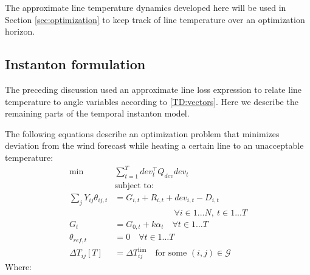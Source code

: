 \documentclass[conference]{IEEEtran}
\begin{document}
The approximate line temperature dynamics developed here will be used in Section \ref{sec:optimization} to keep track of line temperature over an optimization horizon.

\subsection{Instanton formulation}\label{sec:instanton-formulation}
The preceding discussion used an approximate line loss expression to relate line temperature to angle variables according to \eqref{TD:vectors}. Here we describe the remaining parts of the temporal instanton model.

The following equations describe an optimization problem that minimizes deviation from the wind forecast while heating a certain line to an unacceptable temperature:
\begin{subequations}\label{I:all}
\begin{align}
\label{I:obj}\min & \sum_{t=1}^{T} dev_t^\top Q_{dev} dev_t \\
\nonumber& \text{subject to:} \\
\label{I:flow} \sum_j Y_{ij} \theta_{ij,t} & = G_{i,t} + R_{i,t} + dev_{i,t} - D_{i,t}\\
\nonumber &\qquad\qquad\qquad\quad \forall i \in 1... N,~t\in 1... T \\
\label{I:conv} G_t &= G_{0,t} + k\alpha_t \quad \forall t\in 1\ldots T \\
\label{I:slack} \theta_{ref,t} & = 0 \quad \forall t\in 1\ldots T \\
\label{I:lim} \Delta T_{ij}[T] &= \Delta T_{ij}^\text{lim}\quad \text{for some }(i,j)\in \mathcal{G}
\end{align}
\end{subequations}
Where:
\end{document}
